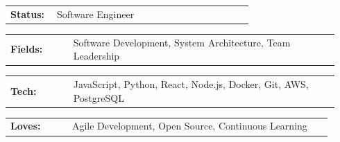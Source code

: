 \documentclass[10pt,A4]{article}
\newcommand{\tzlarrow}{(0,0) -- (0.2,0) -- (0.3,0.2) -- (0.2,0.4) -- (0,0.4) -- (0.1,0.2) -- cycle;}
\newcommand{\larrow}[1]
{\begin{tikzpicture}[scale=0.58]
	 \filldraw[fill=#1!100,draw=#1!100!black]  \tzlarrow
 \end{tikzpicture}
}
\newcommand{\metasection}[2]{
	\begin{tabular*}{1\linewidth}{p{0.18\linewidth} p{0.76\linewidth}}
		\larrow{bgcol}\normalsize{\textbf{\textcolor{sectcol}{#1}}}&#2\\
	\end{tabular*}
}
\newcommand{\spread}{7pt}
\begin{document}
\begin{minipage}[t]{0.485\textwidth}

\vspace{\spread}

\metasection{Status:}{Software Engineer}
\metasection{Fields:}{Software Development, System Architecture, Team Leadership} 
\end{minipage}
\hfill
\begin{minipage}[t]{0.485\textwidth}

\vspace{5pt}

\metasection{Tech:}{JavaScript, Python, React, Node.js, Docker, Git, AWS, PostgreSQL}
\metasection{Loves:}{Agile Development, Open Source, Continuous Learning}
\end{minipage}
\end{document}
